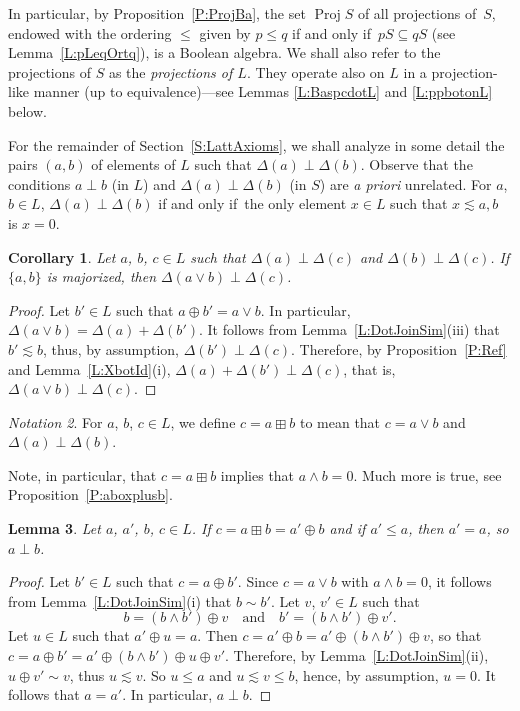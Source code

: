 \documentclass[psamsfonts,reqno]{memo-l}
\theoremstyle{plain}
\newtheorem{lemma}{Lemma}[section]
\newtheorem{corollary}[lemma]{Corollary}
\theoremstyle{definition}
\theoremstyle{remark}
\newtheorem{notation}[lemma]{Notation}
\numberwithin{equation}{section}
\renewcommand{\iff}{if and only if}
\DeclareMathOperator{\BB}{Proj}
\newcommand{\DD}{\Delta}
\newcommand{\set}[1]{\{#1\}}
\begin{document}
In particular, by Proposition~\ref{P:ProjBa}, the set
$\BB{S}$\index{pzzroj@$\BB{S}$} of all projections of~$S$, endowed with the
ordering $\leq$ given by $p\leq q$
\iff\ $pS\subseteq qS$ (see Lemma~\ref{L:pLeqOrtq}), is
a Boolean algebra. We shall also refer to the
projections of $S$ as the \emph{projections of $L$}. They operate also on
$L$ in a projection-like manner (up to equivalence)---see Lemmas
\ref{L:BaspcdotL} and \ref{L:ppbotonL} below.

For the remainder of Section~\ref{S:LattAxioms}, we shall analyze in some
detail the pairs $(a,b)$ of elements of $L$ such that $\DD(a)\perp\DD(b)$.
Observe that the conditions $a\perp b$ (in $L$) and $\DD(a)\perp\DD(b)$
(in $S$) are \emph{a priori} unrelated. For $a$, $b\in L$,
$\DD(a)\perp\DD(b)$ \iff\ the only element $x\in L$ such that
$x\lesssim a,b$ is $x=0$.

\begin{corollary}\label{C:Ref}
Let $a$, $b$, $c\in L$ such that $\DD(a)\perp\DD(c)$ and
$\DD(b)\perp\DD(c)$. If $\set{a,b}$ is majorized, then
$\DD(a\vee b)\perp\DD(c)$.
\end{corollary}

\begin{proof}
Let $b'\in L$ such that $a\oplus b'=a\vee b$.
In particular, $\DD(a\vee b)=\DD(a)+\DD(b')$.
It follows from Lemma~\ref{L:DotJoinSim}(iii) that $b'\lesssim b$, thus, by
assumption, $\DD(b')\perp\DD(c)$. Therefore, by Proposition~\ref{P:Ref} and
Lemma~\ref{L:XbotId}(i), $\DD(a)+\DD(b')\perp\DD(c)$, that is,
$\DD(a\vee b)\perp\DD(c)$.
\end{proof}

\begin{notation}
For $a$, $b$, $c\in L$, we define $c=a\boxplus b$
to mean that $c=a\vee b$ and $\DD(a)\perp\DD(b)$.
\end{notation}

Note, in particular, that $c=a\boxplus b$ implies that $a\wedge b=0$. Much
more is true, see Proposition~\ref{P:aboxplusb}.

\begin{lemma}\label{L:aboxbplusb}
Let $a$, $a'$, $b$, $c\in L$. If $c=a\boxplus b=a'\oplus b$ and if
$a'\leq a$, then $a'=a$, so $a\perp b$.
\end{lemma}

\begin{proof}
Let $b'\in L$ such that $c=a\oplus b'$. Since $c=a\vee b$ with $a\wedge
b=0$, it follows from Lemma~\ref{L:DotJoinSim}(i) that $b\sim b'$. Let $v$,
$v'\in L$ such that
   \[
   b=(b\wedge b')\oplus v\quad\text{and}\quad b'=(b\wedge b')\oplus v'.
   \]
Let $u\in L$ such that $a'\oplus u=a$. Then
$c=a'\oplus b=a'\oplus(b\wedge b')\oplus v$, so that
$c=a\oplus b'=a'\oplus(b\wedge b')\oplus u\oplus v'$. Therefore, by
Lemma~\ref{L:DotJoinSim}(ii), $u\oplus v'\sim v$, thus $u\lesssim v$. So
$u\leq a$ and $u\lesssim v\leq b$, hence, by assumption, $u=0$. It follows
that $a=a'$. In particular, $a\perp b$.
\end{proof}
\end{document}
